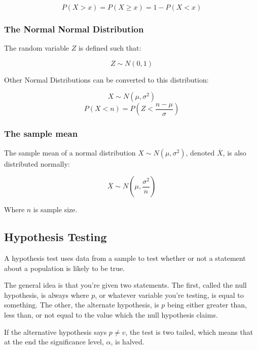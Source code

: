 \documentclass{article}
\begin{document}
$$ P(X > x) = P(X \geq x) = 1 - P(X < x) $$

\subsubsection{The Normal Normal Distribution}

The random variable $Z$ is defined such that:

$$ Z \sim N(0, 1) $$

Other Normal Distributions can be converted to this distribution:

$$ X \sim N(\mu, \sigma^2) $$
$$ P(X < n) = P(Z < \frac{n-\mu}{\sigma}) $$

\subsubsection{The sample mean}

The sample mean of a normal distribution $X \sim N(\mu, \sigma^2)$, denoted $\overline X$, is also distributed normally:

$$ \overline X \sim N(\mu, \frac{\sigma^2}{n}) $$

Where $n$ is sample size.

\subsection{Hypothesis Testing}

A hypothesis test uses data from a sample to test whether or not a statement about a population
is likely to be true.

The general idea is that you're given two statements. The first, called the null hypothesis,
is always where $p$, or whatever variable you're testing, is equal to something. The other,
the alternate hypothesis, is $p$ being either greater than, less than, or not equal to the
value which the null hypothesis claims.

If the alternative hypothesis says $p \neq v$, the test is two tailed, which means that
at the end the significance level, $\alpha$, is halved.
\end{document}
